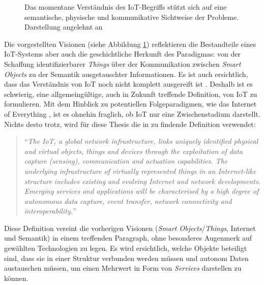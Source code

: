 \begin{figure}[h]
    \centering
    \caption{Das momentane Verständnis des \ac{IoT}-Begriffs stützt sich auf eine semantische, physische und kommunikative Sichtweise der Probleme. Darstellung angelehnt an \cite{atzori2010internet}}
    \label{fig:visions}
\end{figure}


Die vorgestellten Visionen (siehe Abbildung \ref{fig:visions}) reflektieren die Bestandteile eines \ac{IoT}-Systems aber auch die geschichtliche Herkunft des Paradigmas: von der Schaffung identifizierbarer \textit{Things} über der Kommunikation zwischen \textit{Smart Objects} zu der Semantik ausgetauschter Informationen. Es ist auch ersichtlich, dass das Verständnis von \ac{IoT} noch nicht komplett ausgereift ist \cite{atzori2010internet}. Deshalb ist es schwierig, eine allgemeingültige, auch in Zukunft treffende Definition, von \ac{IoT} zu formulieren. Mit dem Hinblick zu potentiellen Folgeparadigmen, wie das Internet of Everything \cite{Snyder2017}, ist es ohnehin fraglich, ob \ac{IoT} nur eine Zwischenstadium darstellt. Nichts desto trotz, wird für diese Thesis die in \cite{Misra2017} zu findende Definition verwendet: 
\begin{quote}
   "`\textit{The \ac{IoT}, a global network infrastructure, links uniquely identified physical and virtual objects, things and devices through the exploitation of data capture (sensing), communication and actuation capabilities. The underlying infrastructure of virtually represented \glq things \grq in an Internet-like structure includes existing and evolving Internet and network developments. Emerging services and applications will be characterised by a high degree of autonomous data capture, event transfer, network connectivity and interoperability.}"'
\end{quote}

Diese Definition vereint die vorherigen Visionen (\textit{Smart Objects}/\textit{Things}, Internet und Semantik) in einem treffenden Paragraph, ohne besonderes Augenmerk auf gewählten Technologien zu legen. Es wird ersichtlich, welche Objekte beteiligt sind, dass sie in einer Struktur verbunden werden müssen und autonom Daten austauschen müssen, um einen Mehrwert in Form von \textit{Services} darstellen zu können. 

